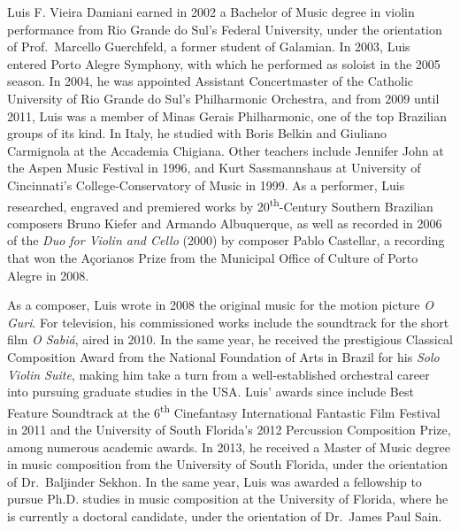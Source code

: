 Luis F. Vieira Damiani earned in 2002 a Bachelor of Music degree in violin performance from Rio Grande do Sul's Federal University, under the orientation of Prof.~Marcello Guerchfeld, a former student of Galamian. In 2003, Luis entered Porto Alegre Symphony, with which he performed as soloist in the 2005 season. In 2004, he was appointed Assistant Concertmaster of the Catholic University of Rio Grande do Sul's Philharmonic Orchestra, and from 2009 until 2011, Luis was a member of Minas Gerais Philharmonic, one of the top Brazilian groups of its kind. In Italy, he studied with Boris Belkin and Giuliano Carmignola at the Accademia Chigiana. Other teachers include Jennifer John at the Aspen Music Festival in 1996, and Kurt Sassmannshaus at University of Cincinnati's College-Conservatory of Music in 1999. As a performer, Luis researched, engraved and premiered works by 20\textsuperscript{th}-Century Southern Brazilian composers Bruno Kiefer and Armando Albuquerque, as well as recorded in 2006 of the \emph{Duo for Violin and Cello} (2000) by composer Pablo Castellar, a recording that won the A\c{c}orianos Prize from the Municipal Office of Culture of Porto Alegre in 2008.

As a composer, Luis wrote in 2008 the original music for the motion picture \emph{O Guri}. For television, his commissioned works include the soundtrack for the short film \emph{O Sabi\'a}, aired in 2010. In the same year, he received the prestigious Classical Composition Award from the National Foundation of Arts in Brazil for his \emph{Solo Violin Suite}, making him take a turn from a well-established orchestral career into pursuing graduate studies in the USA. Luis' awards since include Best Feature Soundtrack at the 6\textsuperscript{th} Cinefantasy International Fantastic Film Festival in 2011 and the University of South Florida's 2012 Percussion Composition Prize, among numerous academic awards. In 2013, he received a Master of Music degree in music composition from the University of South Florida, under the orientation of Dr.~Baljinder Sekhon. In the same year, Luis was awarded a fellowship to pursue Ph.D. studies in music composition at the University of Florida, where he is currently a doctoral candidate, under the orientation of Dr.~James Paul Sain.